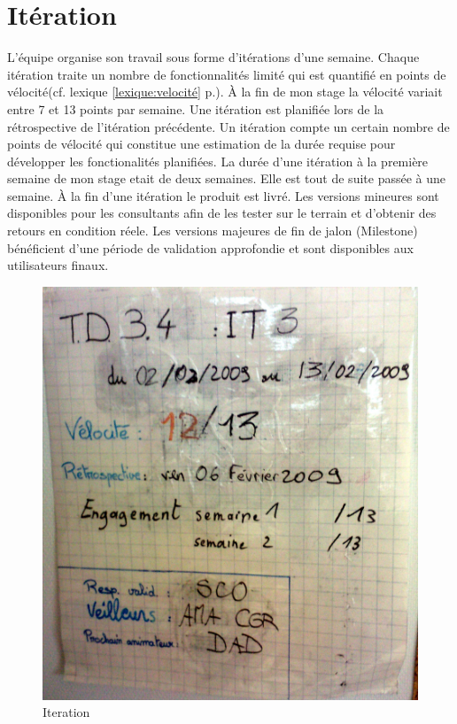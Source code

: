 \section{Itération}
L'équipe organise son travail sous forme d'itérations d'une semaine. Chaque itération traite un nombre de fonctionnalités limité qui est quantifié en points de vélocité(cf. lexique \ref{lexique:velocité} p.\pageref{lexique:velocité}). À la fin de mon stage la vélocité variait entre 7 et 13 points par semaine. Une itération est planifiée lors de la rétrospective de l'itération précédente. Un itération compte un certain nombre de points de vélocité qui constitue une estimation de la durée requise pour développer les fonctionalités planifiées. La durée d'une itération à la première semaine de mon stage etait de deux semaines. Elle est tout de suite passée à une semaine. À la fin d'une itération le produit est livré. Les versions mineures sont disponibles pour les consultants afin de les tester sur le terrain et d'obtenir des retours en condition réele. Les versions majeures de fin de jalon (Milestone) bénéficient d'une période de validation approfondie et sont disponibles aux utilisateurs finaux.

\begin{figure}[!h]
\centering
\includegraphics[scale=0.10]{Illustrations/SP_A0182.jpg}
\caption{Iteration}
\label{fig:Iteration}
\end{figure}

